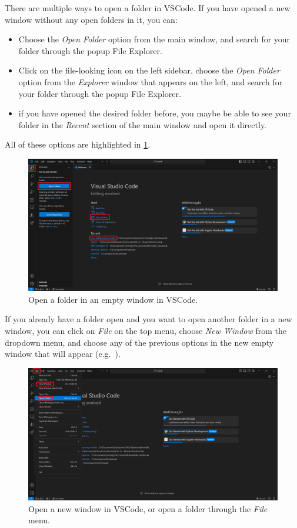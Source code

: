 \documentclass[a4paper,10pt]{article}
\begin{document}
There are multiple ways to open a folder in VSCode. If you have opened a new window without any open folders in it, you can:
\begin{itemize}
    \item Choose the \emph{Open Folder} option from the main window, and search for your folder through the popup File Explorer.
    \item Click on the file-looking icon on the left sidebar, choose the \emph{Open Folder} option from the \emph{Explorer} window that appears on the left, and search for your folder through the popup File Explorer.
    \item if you have opened the desired folder before, you maybe be able to see your folder in the \emph{Recent} section of the main window and open it directly.
\end{itemize}
All of these options are highlighted in \cref{fig:vscode_open_folder_1}.

\begin{figure}[htbp]
    \centering
    \includegraphics[width=\textwidth]{vscode_open_folder_1.png}
    \caption{Open a folder in an empty window in VSCode.}
    \label{fig:vscode_open_folder_1}   
\end{figure}

If you already have a folder open and you want to open another folder in a new window, you can click on \emph{File} on the top menu, choose \emph{New Window} from the dropdown menu, and choose any of the previous options in the new empty window that will appear (e.g.\ ).

\begin{figure}[htbp]
    \centering
    \includegraphics[width=\textwidth]{vscode_open_folder_2.png}
    \caption{Open a new window in VSCode, or open a folder through the \emph{File} menu.}
    \label{fig:vscode_open_folder_2}   
\end{figure}
\end{document}

